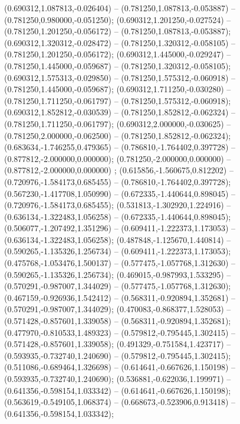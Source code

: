  (0.690312,1.087813,-0.026404) -- (0.781250,1.087813,-0.053887) -- (0.781250,0.980000,-0.051250);
 (0.690312,1.201250,-0.027524) -- (0.781250,1.201250,-0.056172) -- (0.781250,1.087813,-0.053887);
 (0.690312,1.320312,-0.028472) -- (0.781250,1.320312,-0.058105) -- (0.781250,1.201250,-0.056172);
 (0.690312,1.445000,-0.029247) -- (0.781250,1.445000,-0.059687) -- (0.781250,1.320312,-0.058105);
 (0.690312,1.575313,-0.029850) -- (0.781250,1.575312,-0.060918) -- (0.781250,1.445000,-0.059687);
 (0.690312,1.711250,-0.030280) -- (0.781250,1.711250,-0.061797) -- (0.781250,1.575312,-0.060918);
 (0.690312,1.852812,-0.030539) -- (0.781250,1.852812,-0.062324) -- (0.781250,1.711250,-0.061797);
 (0.690312,2.000000,-0.030625) -- (0.781250,2.000000,-0.062500) -- (0.781250,1.852812,-0.062324);
 (0.683634,-1.746255,0.479365) -- (0.786810,-1.764402,0.397728) -- (0.877812,-2.000000,0.000000);
 (0.781250,-2.000000,0.000000) -- (0.877812,-2.000000,0.000000) ;
 (0.615856,-1.560675,0.812202) -- (0.720976,-1.584173,0.685455) -- (0.786810,-1.764402,0.397728);
 (0.567230,-1.417708,1.050990) -- (0.672335,-1.440644,0.898045) -- (0.720976,-1.584173,0.685455);
 (0.531813,-1.302920,1.224916) -- (0.636134,-1.322483,1.056258) -- (0.672335,-1.440644,0.898045);
 (0.506077,-1.207492,1.351296) -- (0.609411,-1.222373,1.173053) -- (0.636134,-1.322483,1.056258);
 (0.487848,-1.125670,1.440814) -- (0.590265,-1.135326,1.256734) -- (0.609411,-1.222373,1.173053);
 (0.475768,-1.053476,1.500137) -- (0.577475,-1.057768,1.312630) -- (0.590265,-1.135326,1.256734);
 (0.469015,-0.987993,1.533295) -- (0.570291,-0.987007,1.344029) -- (0.577475,-1.057768,1.312630);
 (0.467159,-0.926936,1.542412) -- (0.568311,-0.920894,1.352681) -- (0.570291,-0.987007,1.344029);
 (0.470083,-0.868377,1.528053) -- (0.571428,-0.857601,1.339058) -- (0.568311,-0.920894,1.352681);
 (0.477970,-0.810533,1.489323) -- (0.579812,-0.795445,1.302415) -- (0.571428,-0.857601,1.339058);
 (0.491329,-0.751584,1.423717) -- (0.593935,-0.732740,1.240690) -- (0.579812,-0.795445,1.302415);
 (0.511086,-0.689464,1.326698) -- (0.614641,-0.667626,1.150198) -- (0.593935,-0.732740,1.240690);
 (0.536881,-0.622036,1.199971) -- (0.641356,-0.598154,1.033342) -- (0.614641,-0.667626,1.150198);
 (0.563619,-0.549105,1.068374) -- (0.668673,-0.523906,0.913418) -- (0.641356,-0.598154,1.033342);
